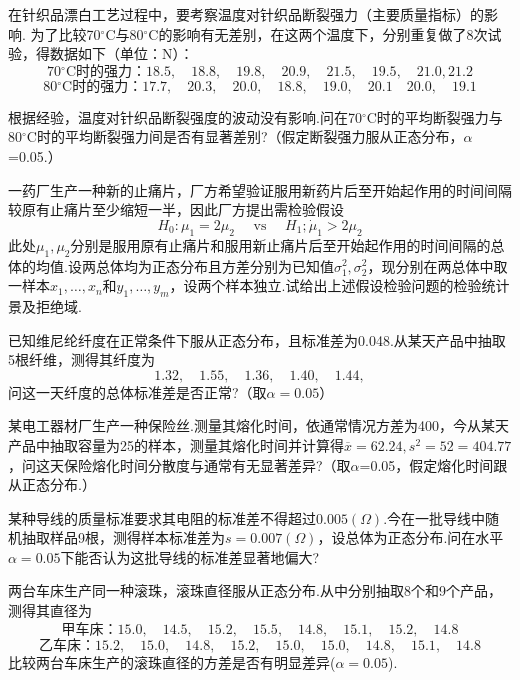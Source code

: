 \begin{xiti}
	\item 在针织品漂白工艺过程中，要考察温度对针织品断裂强力（主要质量指标）的影响.
	为了比较70$^{\circ}$C与80$^{\circ}$C的影响有无差别，在这两个温度下，分别重复做了8次试验，得数据如下（单位：N）：
	\[\text{70$^{\circ}$C时的强力：}18.5,\quad18.8,\quad19.8 , \quad 20.9 , \quad 21.5 , \quad 19.5 , \quad 21.0,21.2\]
	\[\text{80$^{\circ}$C时的强力：}17.7,\quad 20.3,\quad 20.0,\quad 18.8,\quad 19.0,\quad 20.1\quad 20.0,\quad 19.1\]
	
	根据经验，温度对针织品断裂强度的波动没有影响.问在70$^{\circ}$C时的平均断裂强力与80$^{\circ}$C时的平均断裂强力间是否有显著差别?（假定断裂强力服从正态分布，$\alpha$=0.05.）
	
	\item 一药厂生产一种新的止痛片，厂方希望验证服用新药片后至开始起作用的时间间隔较原有止痛片至少缩短一半，因此厂方提出需检验假设
	\[H _ { 0 } : \mu _ { 1 } = 2 \mu _ { 2 } \quad \text { vs } \quad H _ { 1 } ; \dot { \mu } _ { 1 } > 2 \mu _ { 2 }\]
	此处$\mu_{1},\mu_{2}$分别是服用原有止痛片和服用新止痛片后至开始起作用的时间间隔的总体的均值.设两总体均为正态分布且方差分别为已知值$\sigma_{1}^{2},\sigma_{2}^{2}$，现分别在两总体中取一样本$x_{1},\dotsc,x_{n}$和$y_{1},\dotsc,y_{m}$，设两个样本独立.试给出上述假设检验问题的检验统计景及拒绝域.
	
	\item 已知维尼纶纤度在正常条件下服从正态分布，且标准差为0.048.从某天产品中抽取5根纤维，测得其纤度为
	\[1.32,\quad 1.55,\quad 1.36,\quad1.40,\quad1.44,\]
	问这一天纤度的总体标准差是否正常?（取$\alpha=0.05$）
	
	\item 某电工器材厂生产一种保险丝.测量其熔化时间，依通常情况方差为400，今从某天产品中抽取容量为25的样本，测量其熔化时间并计算得$\overline{ x }=62.24,s^{2}=52=404.77$，问这天保险熔化时间分散度与通常有无显著差异?（取$\alpha$=0.05，假定熔化时间跟从正态分布.）
	
	\item 某种导线的质量标准要求其电阻的标准差不得超过$0.005 ( \Omega )$.今在一批导线中随机抽取样品9根，测得样本标准差为$s=0.007 ( \Omega )$，设总体为正态分布.问在水平$\alpha=0.05$下能否认为这批导线的标准差显著地偏大?
	
	\item 两台车床生产同一种滚珠，滚珠直径服从正态分布.从中分别抽取8个和9个产品，测得其直径为
	\[\text{甲车床：}15.0 , \quad 14.5 , \quad 15.2 , \quad 15.5 , \quad 14.8 , \quad 15.1 , \quad 15.2 , \quad 14.8\]
	\[\text{乙车床：}15.2 , \quad 15.0 , \quad 14.8 , \quad 15.2 , \quad 15.0 , \quad 15.0 , \quad 14.8 , \quad 15.1 , \quad 14.8\]
	比较两台车床生产的滚珠直径的方差是否有明显差异($\alpha=0.05$).
	

\end{xiti}
